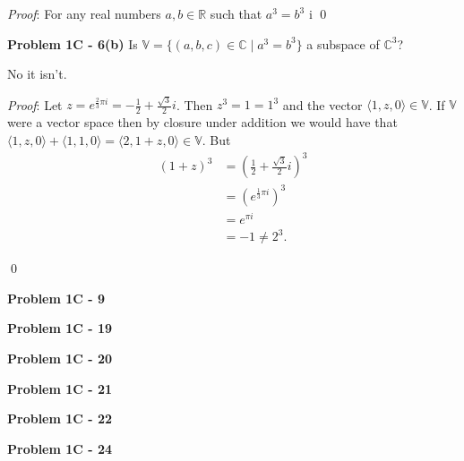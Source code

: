 \documentclass[12pt]{article}
\newcommand{\problem}[1]{\hspace{-4 ex} \large \textbf{Problem #1} }
\renewenvironment{proof}{\hspace{-4 ex} \emph{Proof}:}{\qed}
\newcommand{\RR}{\mathbb{R}}
\newcommand{\CC}{\mathbb{C}}
\newcommand{\VV}{\mathbb{V}}
\begin{document}
	\begin{proof}
		For any real numbers $a,b \in \RR$ such that $a^3 = b^3$ i
	\end{proof}

\problem{1C - 6(b)} Is $\VV = \{(a,b,c)\in \CC \mid a^3=b^3\}$ a subspace of $\CC^3$? \bigbreak

No it isn't. \bigbreak

	\begin{proof}
		Let $z = e^{\frac{2}{3}\pi i} = -\frac{1}{2} + \frac{\sqrt{3}}{2}i$. Then $z^3 = 1 = 1^3$ and the vector $\langle 1, z, 0 \rangle \in \VV$. If $\VV$ were a vector space then by closure under addition we would have that $\langle 1, z, 0 \rangle + \langle 1, 1, 0 \rangle = \langle 2, 1+z, 0 \rangle \in \VV$. But
		\begin{align*}
			(1+z)^3 &= \left(\frac{1}{2} + \frac{\sqrt{3}}{2}i \right)^3 \\
			&= (e^{\frac{1}{3}\pi i} ) ^ 3 \\
			&= e^{\pi i} \\
			& = -1 \neq 2^3 \text{.}
		\end{align*}
		
	\end{proof}

\problem{1C - 9}

\problem{1C - 19}

\problem{1C - 20}

\problem{1C - 21}

\problem{1C - 22}

\problem{1C - 24}
\end{document}
